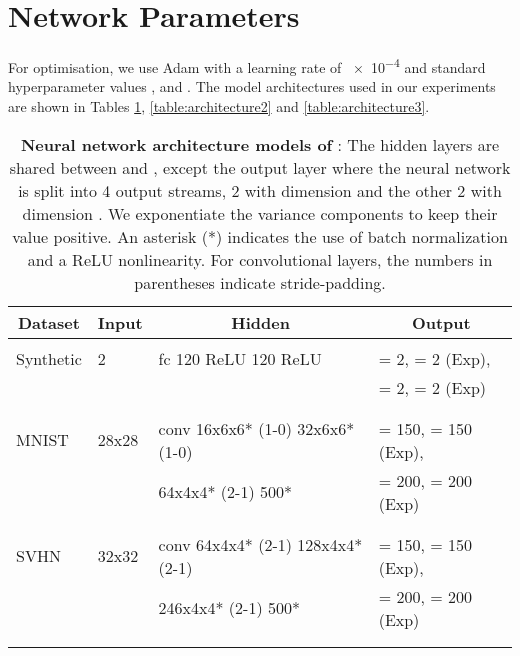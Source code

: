 \documentclass{article} \usepackage{iclr2017_conference,times}
\begin{document}




\appendix
{}
\section{Network Parameters}
\label{ap:params}
For optimisation, we use Adam \citep{kingma2014adam} with a learning rate of \num{e-4} and standard hyperparameter values ,  and . The model architectures used in our experiments are shown in Tables \ref{table:architecture1}, \ref{table:architecture2} and \ref{table:architecture3}.

\begin{table}[ht]
\caption{\textbf{Neural network architecture models of }: The hidden layers are shared between  and , except the output layer where the neural network is split into 4 output streams, 2 with dimension  and the other 2 with dimension . We exponentiate the variance components to keep their value positive. An asterisk (*) indicates the use of batch normalization and a ReLU nonlinearity. For convolutional layers, the numbers in parentheses indicate stride-padding.}
\label{table:architecture1}
\centering
\begin{tabular}{llll}
\multicolumn{1}{c}{\bf Dataset} &\multicolumn{1}{c}{\bf Input}  &\multicolumn{1}{c}{\bf Hidden}		&\multicolumn{1}{c}{\bf Output }
\\ \hline \\
Synthetic  & 2  &  fc 120 ReLU 120 ReLU  				            &   = 2,  = 2 (Exp), \\
  & & 																						&	  = 2,  = 2 (Exp) \\
\\ \hline \\
MNIST  &28x28 & conv 16x6x6* (1-0) 32x6x6* (1-0)  &  = 150,  = 150 (Exp),\\
  & &64x4x4* (2-1) 500* 														&	 = 200,  = 200 (Exp)\\
\\	\hline \\
SVHN  &32x32 & conv 64x4x4* (2-1) 128x4x4* (2-1)  &  = 150,  = 150 (Exp),\\
  & & 	246x4x4* (2-1) 500*											 	&	 = 200,  = 200 (Exp) \\
\\ \hline \\
\end{tabular}
\end{table}
\end{document}
